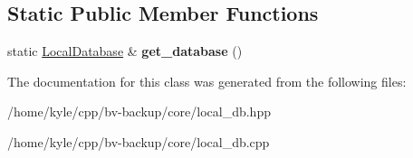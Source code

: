 \subsection*{Static Public Member Functions}
\begin{DoxyCompactItemize}
\item 
\mbox{\label{class_backup_1_1_database_1_1_local_database_a646eb6daa0b1fac43475137b351aa625}} 
static \hyperlink{class_backup_1_1_database_1_1_local_database}{Local\+Database} \& {\bfseries get\+\_\+database} ()
\end{DoxyCompactItemize}


The documentation for this class was generated from the following files\+:\begin{DoxyCompactItemize}
\item 
/home/kyle/cpp/bv-\/backup/core/local\+\_\+db.\+hpp\item 
/home/kyle/cpp/bv-\/backup/core/local\+\_\+db.\+cpp\end{DoxyCompactItemize}
